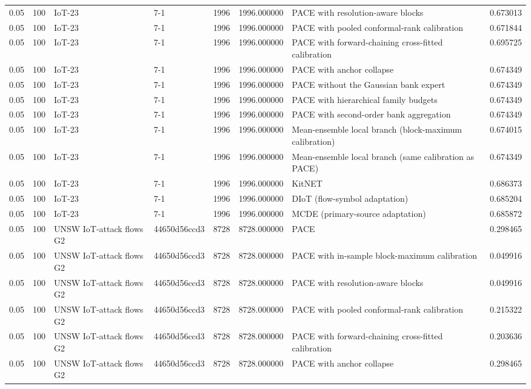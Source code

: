 \begin{tabular}{llllllll}
0.05 & 100 & IoT-23 & 7-1 & 1996 & 1996.000000 & PACE with resolution-aware blocks & 0.673013 \\
0.05 & 100 & IoT-23 & 7-1 & 1996 & 1996.000000 & PACE with pooled conformal-rank calibration & 0.671844 \\
0.05 & 100 & IoT-23 & 7-1 & 1996 & 1996.000000 & PACE with forward-chaining cross-fitted calibration & 0.695725 \\
0.05 & 100 & IoT-23 & 7-1 & 1996 & 1996.000000 & PACE with anchor collapse & 0.674349 \\
0.05 & 100 & IoT-23 & 7-1 & 1996 & 1996.000000 & PACE without the Gaussian bank expert & 0.674349 \\
0.05 & 100 & IoT-23 & 7-1 & 1996 & 1996.000000 & PACE with hierarchical family budgets & 0.674349 \\
0.05 & 100 & IoT-23 & 7-1 & 1996 & 1996.000000 & PACE with second-order bank aggregation & 0.674349 \\
0.05 & 100 & IoT-23 & 7-1 & 1996 & 1996.000000 & Mean-ensemble local branch (block-maximum calibration) & 0.674015 \\
0.05 & 100 & IoT-23 & 7-1 & 1996 & 1996.000000 & Mean-ensemble local branch (same calibration as PACE) & 0.674349 \\
0.05 & 100 & IoT-23 & 7-1 & 1996 & 1996.000000 & KitNET & 0.686373 \\
0.05 & 100 & IoT-23 & 7-1 & 1996 & 1996.000000 & DIoT (flow-symbol adaptation) & 0.685204 \\
0.05 & 100 & IoT-23 & 7-1 & 1996 & 1996.000000 & MCDE (primary-source adaptation) & 0.685872 \\
0.05 & 100 & UNSW IoT-attack flows G2 & 44650d56ccd3 & 8728 & 8728.000000 & PACE & 0.298465 \\
0.05 & 100 & UNSW IoT-attack flows G2 & 44650d56ccd3 & 8728 & 8728.000000 & PACE with in-sample block-maximum calibration & 0.049916 \\
0.05 & 100 & UNSW IoT-attack flows G2 & 44650d56ccd3 & 8728 & 8728.000000 & PACE with resolution-aware blocks & 0.049916 \\
0.05 & 100 & UNSW IoT-attack flows G2 & 44650d56ccd3 & 8728 & 8728.000000 & PACE with pooled conformal-rank calibration & 0.215322 \\
0.05 & 100 & UNSW IoT-attack flows G2 & 44650d56ccd3 & 8728 & 8728.000000 & PACE with forward-chaining cross-fitted calibration & 0.203636 \\
0.05 & 100 & UNSW IoT-attack flows G2 & 44650d56ccd3 & 8728 & 8728.000000 & PACE with anchor collapse & 0.298465 \\

\end{tabular}
